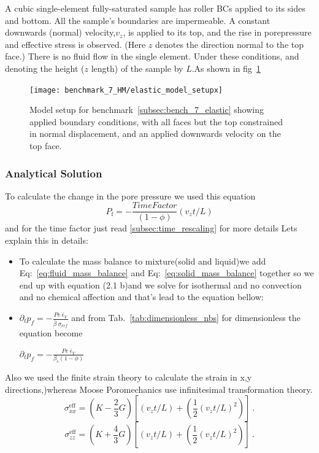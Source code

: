 \documentclass[]{scrreprt}
\newcommand{\pd}{\ensuremath{\partial}}
\newcommand{\pdiff}[2]{\ensuremath{\pd_{#2} #1}}
\begin{document}
A cubic single-element fully-saturated sample has roller BCs applied to its sides and bottom.  All the sample's boundaries are impermeable.  A constant downwards (normal) velocity,$v_{z}$, is applied to its top, and the rise in porepressure and effective stress is observed.  (Here $z$ denotes the direction normal to the top face.)  There is no fluid flow in the single element.
Under these conditions, and denoting the height ($z$ length) of the sample by $L$.As shown in fig~\ref{fig:Benchmark7_cubic}

\begin{figure} 
  \centering
  \texttt{[image: benchmark\_7\_HM/elastic\_model\_setupx]}
  \caption{Model setup for benchmark~\ref{subsec:bench_7_elastic} showing applied boundary conditions, with all faces but the top constrained in normal displacement, and an applied downwards velocity on the top face.}
  \label{fig:Benchmark7_cubic}
\end{figure}
 
\subsubsection{Analytical Solution}

To calculate the change in the pore pressure we used this equation 
\begin{equation}
P_{\mathrm{f}} = -\frac{Time Factor}{(1-\phi)}\left( v_{z}t/L\right)
\end{equation}
and for the time factor just read \ref{subsec:time_rescaling} for more details 
\ifshowallderivations
Lets explain this in details: 
\begin{itemize}
\item To calculate the mass balance to mixture(solid and liquid)we  add Eq:~\ref{eq:fluid_mass_balance} and Eq:~\ref{eq:solid_mass_balance} together so we end up with equation (2.1 b)and we solve for isothermal and no convection and no chemical affection and that's lead to the equation bellow:
\item 

$ \pdiff{p_f}{t}=- \frac{Pe\:\dot{\epsilon_V}}{ \bar{\beta}\:\sigma_{ref}}$  
and from Tab.~\ref{tab:dimensionless_nbs} for dimensionless the equation become 

$ \pdiff{p_f}{t}=- \frac{Pe\:\dot{\epsilon_V}}{ \beta_s(1-\phi)}$

 
\end{itemize} 
\fi
Also we used the finite strain theory \citep[][p.6-7]{Coussy2004}
to calculate the strain in x,y directions,)whereas Moose Poromechanics use infinitesimal transformation theory.
\begin{equation}
\sigma_{xx}^{\mathrm{eff}} = (K - \mbox{$\frac{2}{3}$}G)\left[\left( v_{z}t/L\right)+\left(\frac{1}{2}\left( v_{z}t/L\right)^2\right) \right] \ . 
\end{equation}
\begin{equation}
\sigma_{zz}^{\mathrm{eff}} = (K + \mbox{$\frac{4}{3}$}G)\left[\left( v_{z}t/L\right)+\left(\frac{1}{2}\left( v_{z}t/L\right)^2\right) \right] \ .
\end{equation}
\end{document}
